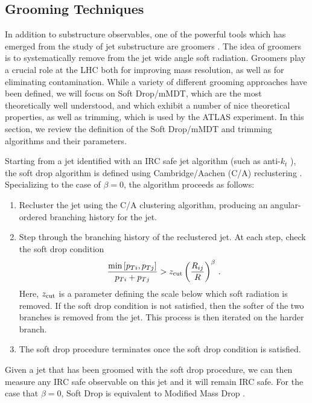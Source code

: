 \documentclass[11pt,letterpaper]{article}
\newcommand{\zcut}{z_{\rm cut}}
\begin{document}
\subsection{Grooming Techniques}\label{sec:groom_tech}

In addition to substructure observables, one of the powerful tools which has emerged from the study of jet substructure are groomers \cite{Butterworth:2008iy,Ellis:2009su,Ellis:2009me,Krohn:2009th,Dasgupta:2013via,Dasgupta:2013ihk}. The idea of groomers is to systematically remove from the jet wide angle soft radiation. Groomers play a crucial role at the LHC both for improving mass resolution, as well as for eliminating contamination. While a variety of different grooming approaches have been defined, we will focus on Soft Drop/mMDT, which are the most theoretically well understood, and which exhibit a number of nice theoretical properties, as well as trimming, which is used by the ATLAS experiment. In this section, we review the definition of the Soft Drop/mMDT and trimming algorithms and their parameters.

Starting from a jet identified with an IRC safe jet algorithm (such as anti-$k_t$ \cite{Cacciari:2008gp}), the soft drop algorithm is defined using Cambridge/Aachen (C/A) reclustering \cite{Dokshitzer:1997in,Wobisch:1998wt,Wobisch:2000dk}.  Specializing to the case of $\beta=0$, the algorithm proceeds as follows:
\begin{enumerate}

\item Recluster the jet using the C/A clustering algorithm, producing an angular-ordered branching history for the jet.

\item Step through the branching history of the reclustered jet.  At each step, check the soft drop condition
\begin{align}\label{eq:sd_cut}
\frac{\min\left[ p_{Ti}, p_{Tj}  \right]}{p_{Ti}+p_{Tj}}> \zcut \left(   \frac{R_{ij}}{R}\right)^\beta \,.
\end{align}
Here, $\zcut$ is a parameter defining the scale below which soft radiation is removed.  If the soft drop condition is not satisfied, then the softer of the two branches is removed from the jet.  This process is then iterated on the harder branch.

\item The soft drop procedure terminates once the soft drop condition is satisfied.

\end{enumerate}
Given a jet that has been groomed with the soft drop procedure, we can then measure any IRC safe observable on this jet and it will remain IRC safe.  For the case that $\beta=0$, Soft Drop is equivalent to Modified Mass Drop \cite{Dasgupta:2013ihk}.
\end{document}
